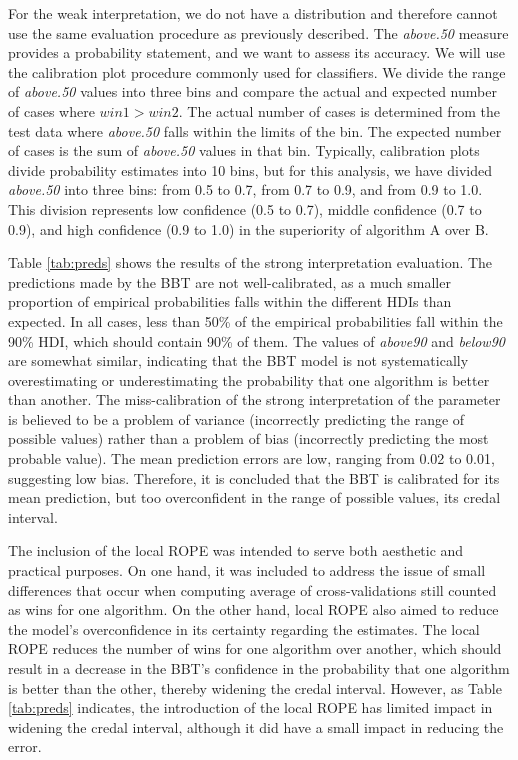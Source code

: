 \documentclass[twoside,11pt,preprint]{article}
\begin{document}
For the weak interpretation, we do not have a distribution and therefore cannot use the same evaluation procedure as previously described. The {\em above.50} measure provides a probability statement, and we want to assess its accuracy. We will use the calibration plot procedure commonly used for classifiers. We divide the range of {\em above.50} values into three bins and compare the actual and expected number of cases where \(win1 > win2\). The actual number of cases is determined from the test data where {\em above.50} falls within the limits of the bin. The expected number of cases is the sum of {\em above.50} values in that bin. Typically, calibration plots divide probability estimates into 10 bins, but for this analysis, we have divided {\em above.50} into three bins: from 0.5 to 0.7, from 0.7 to 0.9, and from 0.9 to 1.0. This division represents low confidence (0.5 to 0.7), middle confidence (0.7 to 0.9), and high confidence (0.9 to 1.0) in the superiority of algorithm A over B.

Table \ref{tab:preds} shows the results of the strong interpretation evaluation. The predictions made by the BBT are not well-calibrated, as a much smaller proportion of empirical probabilities falls within the different HDIs than expected. In all cases, less than 50\% of the empirical probabilities fall within the 90\% HDI, which should contain 90\% of them. The values of {\em above90} and {\em below90} are somewhat similar, indicating that the BBT model is not systematically overestimating or underestimating the probability that one algorithm is better than another. The miss-calibration of the strong interpretation of the parameter is believed to be a problem of variance (incorrectly predicting the range of possible values) rather than a problem of bias (incorrectly predicting the most probable value). The mean prediction errors are low, ranging from 0.02 to 0.01, suggesting low bias. Therefore, it is concluded that the BBT is calibrated for its mean prediction, but too overconfident in the range of possible values, its credal interval.

The inclusion of the local ROPE was intended to serve both aesthetic and practical purposes. On one hand, it was included to address the issue of small differences that occur when computing average of cross-validations still counted as wins for one algorithm. On the other hand, local ROPE also aimed to reduce the model's overconfidence in its certainty regarding the estimates. The local ROPE reduces the number of wins for one algorithm over another, which should result in a decrease in the BBT's confidence in the probability that one algorithm is better than the other, thereby widening the credal interval. However, as Table \ref{tab:preds} indicates, the introduction of the local ROPE has limited impact in widening the credal interval, although it did have a small impact in reducing the error.
\end{document}
